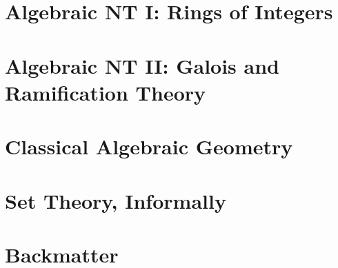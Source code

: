 \documentclass[11pt,numbers=noenddot]{scrreprt}
\begin{document}
\part{Algebraic NT I: Rings of Integers}





\part{Algebraic NT II: Galois and Ramification Theory}




\part{Classical Algebraic Geometry}

\part{Set Theory, Informally}







\part{Backmatter}
\appendix




\clearpage
\printbibliography



%
%
\end{document}
